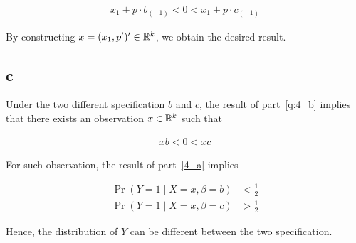 \documentclass[11pt]{article}
\begin{document}
\begin{align*}
    x_1 + p \cdot b_{(-1)} < 0 < x_1 + p \cdot c_{(-1)}
\end{align*}

By constructing $x = (x_1, p^\prime)^\prime \in \mathbb{R}^k$, we obtain the desired result.

\subsection*{c}

Under the two different specification $b$ and $c$, the result of part~\ref{q:4_b} implies that there exists an observation $x \in \mathbb{R}^k$ such that

\begin{align*}
    xb < 0 < xc
\end{align*}

For such observation, the result of part~\ref{4_a} implies

\begin{align*}
    \Pr(Y = 1 \mid X = x, \beta = b) &< \frac{1}{2} \\
    \Pr(Y = 1 \mid X = x, \beta = c) &> \frac{1}{2}
\end{align*}

Hence, the distribution of $Y$ can be different between the two specification.
\end{document}

